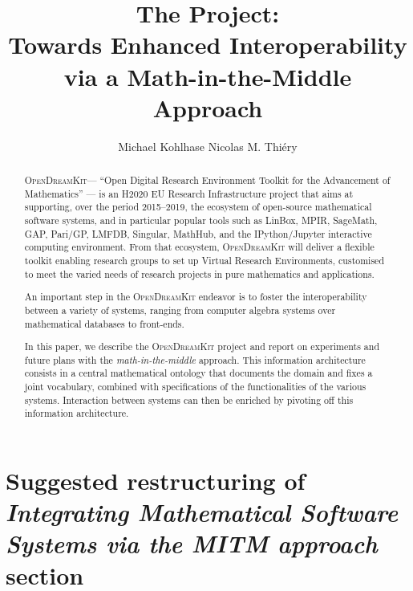 \documentclass{llncs}
\title{The \ODK Project:\\
  Towards Enhanced Interoperability\\
  via a Math-in-the-Middle Approach}
\author{Michael Kohlhase\inst{1} Nicolas M. Thi\'ery\inst{2} }
\institute{Jacobs University, Bremen, Germany \and Universit\'e Paris-Sud, Paris, France}
\newcommand{\software}[1]{\textsc{#1}\xspace}
\newcommand{\ODK}{\software{OpenDreamKit}}
\begin{document}
\maketitle
\begin{abstract}
  \ODK --- ``Open Digital Research Environment Toolkit for the
  Advancement of Mathematics'' --- is an H2020 EU Research
  Infrastructure project that aims at supporting, over the period
  2015--2019, the ecosystem of open-source mathematical software
  systems, and in particular popular tools such as LinBox, MPIR,
  SageMath, GAP, Pari/GP, LMFDB, Singular, MathHub, and the
  IPython/Jupyter interactive computing environment. From that
  ecosystem, \ODK will deliver a flexible toolkit enabling
  research groups to set up Virtual Research Environments, customised
  to meet the varied needs of research projects in pure mathematics
  and applications.

  An important step in the \ODK endeavor is to foster the
  interoperability between a variety of systems, ranging from computer
  algebra systems over mathematical databases to front-ends.

  In this paper, we describe the \ODK project and report on experiments and future
  plans with the \emph{math-in-the-middle} approach.  This information architecture
  consists in a central mathematical ontology that documents the domain and fixes a joint
  vocabulary, combined with specifications of the functionalities of the various
  systems. Interaction between systems can then be enriched by pivoting off this
  information architecture.
\end{abstract}

\section*{Suggested restructuring of \emph{Integrating Mathematical Software Systems via the MITM approach} section}
\end{document}

